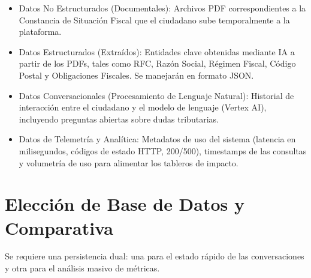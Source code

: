 \documentclass[10pt,a4paper]{article}
\begin{document}
\begin{itemize}
    \item Datos No Estructurados (Documentales): 
    Archivos PDF correspondientes a la Constancia de Situación Fiscal que 
    el ciudadano sube temporalmente a la plataforma.
    \item Datos Estructurados (Extraídos): 
    Entidades clave obtenidas mediante IA a partir de los PDFs, 
    tales como RFC, Razón Social, Régimen Fiscal, Código Postal y 
    Obligaciones Fiscales. Se manejarán en formato JSON.
    \item Datos Conversacionales (Procesamiento de Lenguaje Natural): 
    Historial de interacción entre el ciudadano y el modelo de lenguaje 
    (Vertex AI), incluyendo preguntas abiertas sobre dudas tributarias.
    \item Datos de Telemetría y Analítica: 
    Metadatos de uso del sistema 
    (latencia en milisegundos, códigos de estado HTTP, 200/500), 
    timestamps de las consultas y volumetría de uso para alimentar 
    los tableros de impacto.
\end{itemize}

\newpage    

\section{Elección de Base de Datos y Comparativa}

Se requiere una persistencia dual: 
una para el estado rápido de las conversaciones y otra para el análisis masivo de métricas.
\end{document}
